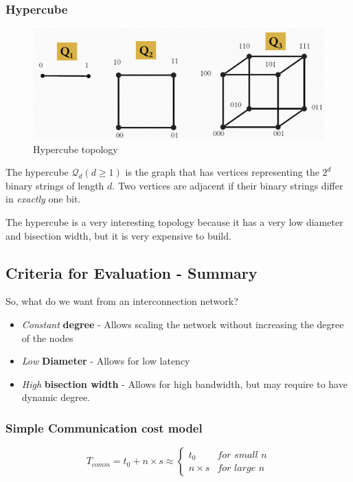 \subsubsection{Hypercube}
\begin{figure}[htbp]
   \centering
   \includegraphics{images/05/hypercube1.png}
   \caption{Hypercube topology}
   \label{fig:05/hypercube1}
\end{figure}

The hypercube $\mathcal{Q}_d(d\geq1)$ is the graph that has vertices representing the $2^d$ binary strings of length $d$. Two vertices are adjacent if their binary strings differ in \textit{exactly} one bit.

The hypercube is a very interesting topology because it has a very low diameter and bisection width, but it is very expensive to build.

\subsection{Criteria for Evaluation - Summary}
So, what do we want from an interconnection network?

\begin{itemize}
   \item \textit{Constant} \textbf{degree} - Allows scaling the network without increasing the degree of the nodes
   \item \textit{Low} \textbf{Diameter} - Allows for low latency
   \item \textit{High} \textbf{bisection width} - Allows for high bandwidth, but may require to have dynamic degree.
\end{itemize}

\subsubsection{Simple Communication cost model}
\begin{equation}\label{eq:05/comm_cost_model}
   T_{comm} = t_0 + n \times s \approx \begin{cases}
      t_0 & \textit{for small n}\\
      n \times s & \textit{for large n}
   \end{cases}
\end{equation}

